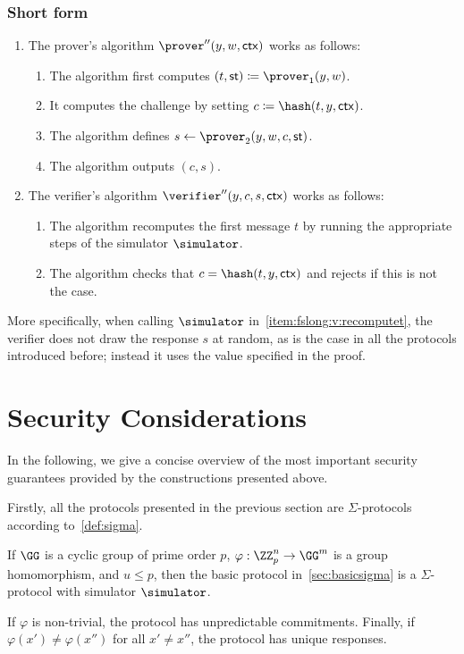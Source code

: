 \documentclass[runningheads]{llncs}
\begin{document}
\subsubsection{Short form}
\begin{enumerate}
  \item
    The prover's algorithm $\prover''(y,w,\ctx)$ works as follows:
    \begin{enumerate}
      \item
        The algorithm first computes $(t,\st)\defeq\prover_1(y,w)$.
      \item
        It computes the challenge by setting $c\defeq\hash(t,y,\ctx)$.
      \item
        The algorithm defines $s\gets\prover_2(y,w,c,\st)$.
      \item
        The algorithm outputs $(c,s)$.
    \end{enumerate}
  \item
    The verifier's algorithm $\verifier''(y,c,s,\ctx)$ works as follows:
    \begin{enumerate}
      \item\label{item:fslong:v:recomputet}
        The algorithm recomputes the first message $t$ by running the appropriate steps of the simulator $\simulator$.
      \item
        The algorithm checks that $c=\hash(t,y,\ctx)$ and rejects if this is not the case.
    \end{enumerate}
\end{enumerate}

More specifically, when calling $\simulator$ in~\cref{item:fslong:v:recomputet}, the verifier does not draw the response $s$ at random, as is the case in all the protocols introduced before;
instead it uses the value specified in the proof.

\section{Security Considerations}

In the following, we give a concise overview of the most important security guarantees provided by the constructions presented above.

Firstly, all the protocols presented in the previous section are $\Sigma$-protocols according to~\cref{def:sigma}.
\begin{theorem}
  If $\GG$ is a cyclic group of prime order $p$, $\varphi:\ZZ_p^n\to\GG^m$ is a group homomorphism, and $u\leq p$, then the basic protocol in~\cref{sec:basicsigma} is a $\Sigma$-protocol with simulator $\simulator$.

  If $\varphi$ is non-trivial, the protocol has unpredictable commitments.
  Finally, if $\varphi(x')\ne\varphi(x'')$ for all $x'\ne x''$, the protocol has unique responses.
\end{theorem}
\end{document}
